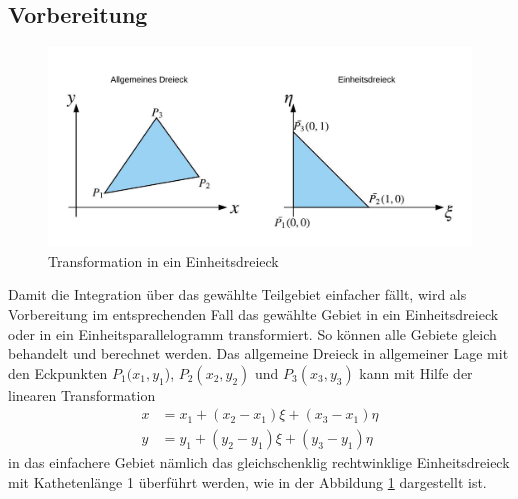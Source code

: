 \subsection{Vorbereitung
\label{fem:section:loesungTrans}}
\begin{figure}
\centering
\includegraphics[scale=0.8]{papers/fem/Images/Dreiecke.jpeg}
\caption{Transformation in ein Einheitsdreieck}
\label{fig:TransformationEinheitsdreieckBild}
\end{figure}
Damit die Integration über das gewählte Teilgebiet einfacher fällt,
wird als Vorbereitung im entsprechenden Fall das gewählte Gebiet
in ein Einheitsdreieck oder in ein Einheitsparallelogramm transformiert.
So können alle Gebiete gleich behandelt und berechnet werden.
Das allgemeine Dreieck in allgemeiner Lage mit den Eckpunkten
$P_1(x_1, y_1$), $ P_2(x_2, y_2)$ und $P_3(x_3,y_3)$ kann mit Hilfe
der linearen Transformation
\begin{equation}
	\begin{split}
		x &= x_1 + (x_2 - x_1)\xi + (x_3 - x_1)\eta \\
		y &= y_1 + (y_2 - y_1)\xi + (y_3 - y_1)\eta
		\label{fem:linTransformation}
	\end{split}
\end{equation}
in das einfachere Gebiet nämlich das gleichschenklig rechtwinklige
Einheitsdreieck mit Kathetenlänge 1 überführt werden, wie in der
Abbildung \ref{fig:TransformationEinheitsdreieckBild} dargestellt
ist.

